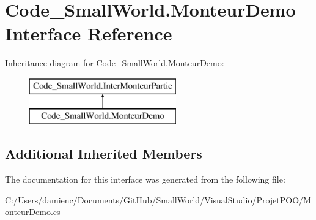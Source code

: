 \hypertarget{interface_code___small_world_1_1_monteur_demo}{\section{Code\-\_\-\-Small\-World.\-Monteur\-Demo Interface Reference}
\label{interface_code___small_world_1_1_monteur_demo}
}
Inheritance diagram for Code\-\_\-\-Small\-World.\-Monteur\-Demo\-:\begin{figure}[H]
\begin{center}
\leavevmode
\includegraphics[height=2.000000cm]{interface_code___small_world_1_1_monteur_demo}
\end{center}
\end{figure}
\subsection*{Additional Inherited Members}


The documentation for this interface was generated from the following file\-:\begin{DoxyCompactItemize}
\item 
C\-:/\-Users/damienc/\-Documents/\-Git\-Hub/\-Small\-World/\-Visual\-Studio/\-Projet\-P\-O\-O/Monteur\-Demo.\-cs\end{DoxyCompactItemize}
